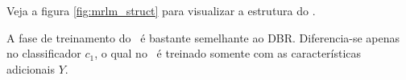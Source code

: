 %  
 
%   
  
  Veja a figura \ref{fig:mrlm_struct} para visualizar a estrutura do \MRLMa. 
  
  A fase de treinamento do \MRLMa~é bastante semelhante ao DBR.
  Diferencia-se apenas no classificador $c_1$, o qual no \MRLMa~é treinado somente com as características adicionais $Y$. 
  
